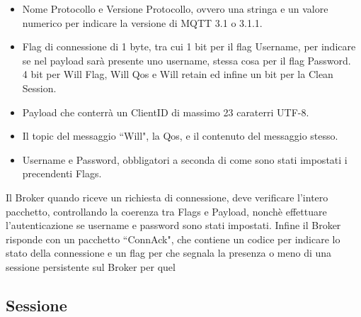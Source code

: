 \documentclass{article}
\begin{document}
\begin{itemize}
	\item Nome Protocollo e Versione Protocollo, ovvero una stringa e un valore numerico per indicare la versione di MQTT 3.1 o 3.1.1.
	\item Flag di connessione di 1 byte, tra cui 1 bit per il flag Username, per indicare se nel payload sarà presente uno username, stessa cosa per il flag Password.\\4 bit per Will Flag, Will Qos e Will retain ed infine un bit per la Clean Session. 
	\item Payload che conterrà un ClientID di massimo 23 caraterri UTF-8.
	\item Il topic del messaggio ``Will", la Qos, e il contenuto del messaggio stesso.
	\item Username e Password, obbligatori a seconda di come sono stati impostati i precendenti Flags.
\end{itemize}
Il Broker quando riceve un richiesta di connessione, deve verificare l'intero pacchetto, controllando la coerenza tra Flags e Payload, nonchè effettuare l'autenticazione se username e password sono stati impostati. Infine il Broker risponde con un pacchetto ``ConnAck", che contiene un codice per indicare lo stato della connessione e un flag per che segnala la presenza o meno di una sessione persistente sul Broker per quel 


\subsection{Sessione}
\end{document}
